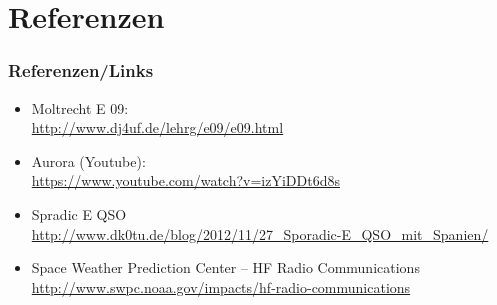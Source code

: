


\section*{Referenzen}

\begin{frame}
    \frametitle{Referenzen/Links}
    
    \footnotesize
    \begin{itemize}
        \item Moltrecht E 09: \\
              \url{http://www.dj4uf.de/lehrg/e09/e09.html}
        \item Aurora (Youtube): \\
              \url{https://www.youtube.com/watch?v=izYiDDt6d8s}
        \item Spradic E QSO \\
              \url{http://www.dk0tu.de/blog/2012/11/27_Sporadic-E_QSO_mit_Spanien/}
	\item Space Weather Prediction Center -- HF Radio Communications \\
	      \url{http://www.swpc.noaa.gov/impacts/hf-radio-communications}
    \end{itemize}

\end{frame}


